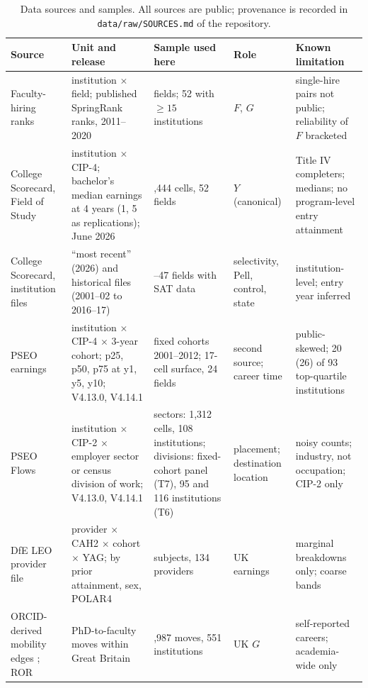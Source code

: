 \documentclass[11pt]{article}
\begin{document}
\begin{table}[!tbp]
\centering
\caption{Data sources and samples. All sources are public; provenance is recorded in
\texttt{data/raw/SOURCES.md} of the repository.}\label{tab:data}
\scriptsize
\renewcommand{\arraystretch}{0.92}
\setlength{\tabcolsep}{3pt}
\begin{tabular}{@{}>{\raggedright\arraybackslash}p{3.0cm}>{\raggedright\arraybackslash}p{3.6cm}>{\raggedright\arraybackslash}p{3.3cm}>{\raggedright\arraybackslash}p{1.9cm}>{\raggedright\arraybackslash}p{3.8cm}@{}}
\toprule
Source & Unit and release & Sample used here & Role & Known limitation \\
\midrule
Faculty-hiring ranks \citep{wapman2022data} & institution $\times$ field; published SpringRank ranks, 2011--2020 & 66 fields; 52 with $\ge 15$ institutions & $F$, $G$ & single-hire pairs not public; reliability of $F$ bracketed \\
College Scorecard, Field of Study \citep{scorecard} & institution $\times$ CIP-4; bachelor's median earnings at 4 years (1, 5 as replications); June 2026 & 3,444 cells, 52 fields & $Y$ (canonical) & Title IV completers; medians; no program-level entry attainment \\
College Scorecard, institution files \citep{scorecard} & ``most recent'' (2026) and historical files (2001--02 to 2016--17) & 46--47 fields with SAT data & selectivity, Pell, control, state & institution-level; entry year inferred \\
PSEO earnings \citep{pseo, pseo2026} & institution $\times$ CIP-4 $\times$ 3-year cohort; p25, p50, p75 at y1, y5, y10; V4.13.0, V4.14.1 & fixed cohorts 2001--2012; 17-cell surface, 24 fields & second source; career time & public-skewed; 20 (26) of 93 top-quartile institutions \\
PSEO Flows \citep{pseo, pseo2026} & institution $\times$ CIP-2 $\times$ employer sector or census division of work; V4.13.0, V4.14.1 & sectors: 1,312 cells, 108 institutions; divisions: fixed-cohort panel (T7), 95 and 116 institutions (T6) & placement; destination location & noisy counts; industry, not occupation; CIP-2 only \\
DfE LEO provider file \citep{dfe_leo_provider} & provider $\times$ CAH2 $\times$ cohort $\times$ YAG; by prior attainment, sex, POLAR4 & 33 subjects, 134 providers & UK earnings & marginal breakdowns only; coarse bands \\
ORCID-derived mobility edges \citep{li2026orcid}; ROR \citep{ror2026data} & PhD-to-faculty moves within Great Britain & 11,987 moves, 551 institutions & UK $G$ & self-reported careers; academia-wide only \\

\end{tabular}
\end{table}
\end{document}
